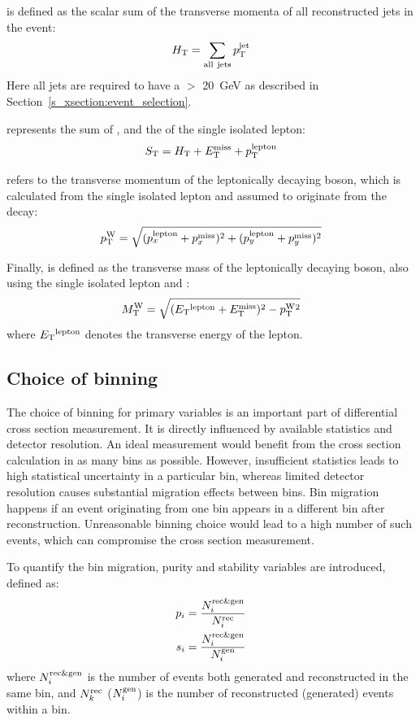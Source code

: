 \HT is defined as the scalar sum of the transverse momenta of all reconstructed jets in the event:
\[H_{\mathrm{T}} = \sum_{\mathrm{all~jets}}p_{\mathrm{T}}^{\mathrm{jet}}\]
Here all jets are required to have a \pt $>$ \SI{20}{\GeV} as described in Section~\ref{s_xsection:event_selection}.

\ST represents the sum of \HT, \MET and the \pt of the single isolated lepton: 
\[S_{\mathrm{T}} = H_{\mathrm{T}} + E_{\mathrm{T}}^{\textrm{miss}} + p_\mathrm{T}^\mathrm{lepton}\]

\WPT refers to the transverse momentum of the leptonically decaying \W boson, which is calculated from the single
isolated lepton and \MET assumed to originate from the \ttbar decay:
\[p_\mathrm{T}^{\mathrm{W}} = \sqrt{(p_x^{\mathrm{lepton}} + p_x^{\mathrm{miss}})^2 + (p_y^{\mathrm{lepton}} + p_y^{\mathrm{miss}})^2}\]

Finally, \MT is defined as the transverse mass of the leptonically decaying \W boson, also using the single isolated
lepton and \MET:
\[M_\mathrm{T}^{\mathrm{W}} = \sqrt{(E_{\mathrm{T}} {}^{\mathrm{lepton}} +E_{\mathrm{T}}^{\textrm{miss}})^2 - p_\mathrm{T}^{\mathrm{W}} {}^2}\]
where $E_{\mathrm{T}} {}^{\mathrm{lepton}}$ denotes the transverse energy of the lepton.

\subsection{Choice of binning}
\label{ss_xsection:binning}

The choice of binning for primary variables is an important part of differential cross section measurement. It is
directly influenced by available statistics and detector resolution. An ideal measurement would benefit from the cross
section calculation in as many bins as possible. However, insufficient statistics leads to high statistical uncertainty
in a particular bin, whereas limited detector resolution causes substantial migration effects between bins. Bin
migration happens if an event originating from one bin appears in a different bin after reconstruction. Unreasonable
binning choice would lead to a high number of such events, which can compromise the cross section measurement.

To quantify the bin migration, purity and stability variables are introduced, defined as:
\begin{align}
p_i = \frac{N^{\mathrm{rec}\&\mathrm{gen}}_i}{N^{\mathrm{rec}}_i} \\
s_i = \frac{N^{\mathrm{rec}\&\mathrm{gen}}_i}{N^{\mathrm{gen}}_i}
\end{align}
where $N^{\mathrm{rec}\&\mathrm{gen}}_i$ is the number of events both generated and reconstructed in the same bin, and
$N^{\mathrm{rec}}_k$ ($N^{\mathrm{gen}}_i$) is the number of reconstructed (generated) events within a bin.

